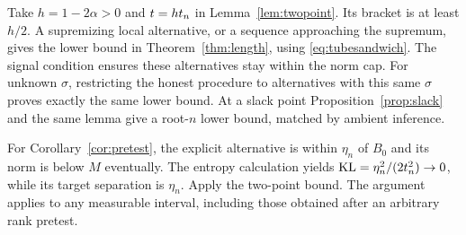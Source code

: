 Take $h=1-2\alpha>0$ and $t=ht_n$ in Lemma~\ref{lem:twopoint}. Its bracket is at least $h/2$. A supremizing local alternative, or a sequence approaching the supremum, gives the lower bound in Theorem~\ref{thm:length}, using \eqref{eq:tubesandwich}. The signal condition ensures these alternatives stay within the norm cap. For unknown $\sigma$, restricting the honest procedure to alternatives with this same $\sigma$ proves exactly the same lower bound. At a slack point Proposition~\ref{prop:slack} and the same lemma give a root-$n$ lower bound, matched by ambient inference.

For Corollary~\ref{cor:pretest}, the explicit alternative is within $\eta_n$ of $B_0$ and its norm is below $M$ eventually. The entropy calculation yields $\operatorname{KL}=\eta_n^2/(2t_n^2)\to0$, while its target separation is $\eta_n$. Apply the two-point bound. The argument applies to any measurable interval, including those obtained after an arbitrary rank pretest.

